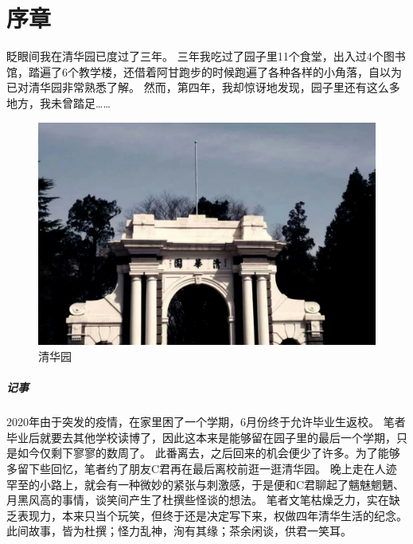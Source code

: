 \chapter{序章}

眨眼间我在清华园已度过了三年。
三年我吃过了园子里11个食堂，出入过4个图书馆，踏遍了6个教学楼，还借着阿甘跑步的时候跑遍了各种各样的小角落，自以为已对清华园非常熟悉了解。
然而，第四年，我却惊讶地发现，园子里还有这么多地方，我未曾踏足……

\vfill

\begin{figure}[h]
	\centering
	\includegraphics[width=\linewidth]{figures/二校门.jpg}
	清华园
\end{figure}

\paragraph{记事}
2020年由于突发的疫情，在家里困了一个学期，6月份终于允许毕业生返校。
笔者毕业后就要去其他学校读博了，因此这本来是能够留在园子里的最后一个学期，只是如今仅剩下寥寥的数周了。
此番离去，之后回来的机会便少了许多。为了能够多留下些回忆，笔者约了朋友C君再在最后离校前逛一逛清华园。
晚上走在人迹罕至的小路上，就会有一种微妙的紧张与刺激感，于是便和C君聊起了魑魅魍魉、月黑风高的事情，谈笑间产生了杜撰些怪谈的想法。
笔者文笔枯燥乏力，实在缺乏表现力，本来只当个玩笑，但终于还是决定写下来，权做四年清华生活的纪念。
此间故事，皆为杜撰；怪力乱神，洵有其缘；茶余闲谈，供君一笑耳。

